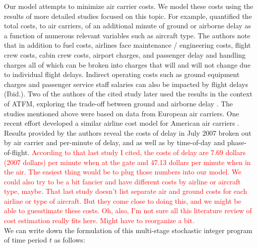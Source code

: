 \documentclass[12pt]{article}
\begin{document}
	Our model attempts to minimize air carrier costs.  We model these costs using the results of more detailed studies focused on this topic.  For example, \cite{true_costs} quantified the total costs, to air carriers, of an additional minute of ground or airborne delay as a function of numerous relevant variables such as aircraft type.  The authors note that in addition to fuel costs, airlines face maintenance / engineering costs, flight crew costs, cabin crew costs, airport charges, and passenger delay and handling charges all of which can be broken into charges that will and will not change due to individual flight delays.  Indirect operating costs such as ground equipment charges and passenger service staff salaries can also be impacted by flight delays (Ibid.).  Two of the authors of the cited study later used the results in the context of ATFM, exploring the trade-off between ground and airborne delay \cite{cook}.  The studies mentioned above were based on data from European air carriers.  One recent effort developed a similar airline cost model for American air carriers \cite{ferguson}.  Results provided by the authors reveal the costs of delay in July 2007 broken out by air carrier and per-minute of delay, and as well as by time-of-day and phase-of-flight.  \textcolor{red}{According to that last study I cited, the costs of delay are 7.69 dollars (2007 dollars) per minute when at the gate and 47.13 dollars per minute when in the air.  The easiest thing would be to plug those numbers into our model.  We could also try to be a bit fancier and have different costs by airline or aircraft type, maybe.  That last study doesn't list separate air and ground costs for each airline or type of aircraft.  But they come close to doing this, and we might be able to guesstimate these costs.  Oh, also, I'm not sure all this literature review of cost estimation really fits here.  Might have to reorganize a bit.}\\
	\newline We can write down the formulation of this multi-stage stochastic integer program of time period \(t\) as follows:
\end{document}
